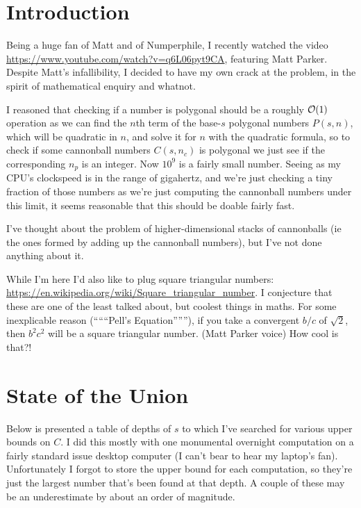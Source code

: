 \section{Introduction}

Being a huge fan of Matt and of Numperphile,
I recently watched the video \url{https://www.youtube.com/watch?v=q6L06pyt9CA},
featuring Matt Parker.  Despite Matt's infallibility, I decided to have my own
crack at the problem, in the spirit of mathematical enquiry and whatnot.

I reasoned that checking if a number is polygonal should be a roughly
\(\operatorname{\mathcal O}(1)\) operation as we can find the \(n\)th term of the base-\(s\)
polygonal numbers \(P(s, n)\), which will be quadratic in \(n\), and solve it
for \(n\) with the quadratic formula, so to check if some cannonball numbers
\(C(s, n_c)\) is polygonal we just see if the corresponding \(n_p\) is an
integer. Now \(10^9\) is a fairly small number. Seeing as my CPU's clockspeed is
in the range of gigahertz, and we're just checking a tiny fraction of those
numbers as we're just computing the cannonball numbers under this limit, it
seems reasonable that this should be doable fairly fast.

I've thought about the problem of higher-dimensional stacks of cannonballs (ie
the ones formed by adding up the cannonball numbers), but I've not done anything
about it.

While I'm here I'd also like to plug square triangular numbers:
\url{https://en.wikipedia.org/wiki/Square_triangular_number}. I conjecture that
these are one of the least talked about, but coolest things in maths. For some
inexplicable reason (``````Pell's Equation''''''), if you take a convergent
\(b / c\) of \(\sqrt 2\), then \(b^2 c^2\) will be a square triangular number.
(Matt Parker voice) How cool is that?!

\section{State of the Union}

Below is presented a table of depths of \(s\) to which I've searched for various
upper bounds on \(C\). I did this mostly with one monumental overnight
computation on a fairly standard issue desktop computer (I can't bear to hear my
laptop's fan). Unfortunately I forgot to store the upper bound for each
computation, so they're just the largest number that's been found at that depth.
A couple of these may be an underestimate by about an order of magnitude.

